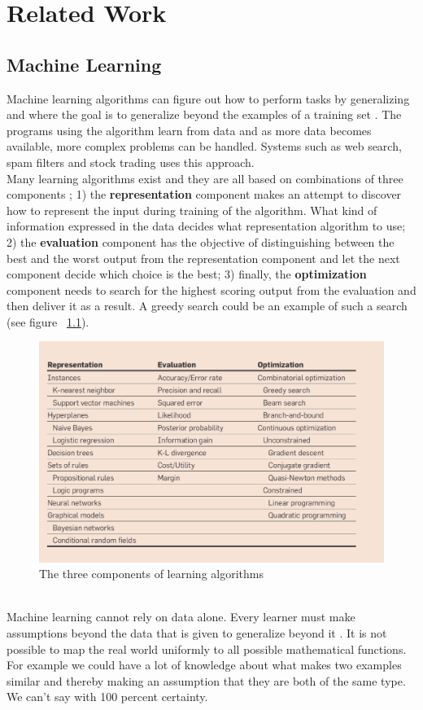 \documentclass[twoside,11pt,openright]{report}
\begin{document}

\chapter{Related Work}
\label{ch:related work}
\section{Machine Learning}
Machine learning algorithms can figure out how to perform tasks by generalizing and where the goal is to generalize beyond the examples of a training set \cite{18}. The programs using the algorithm learn from data and as more data becomes available, more complex problems can be handled. Systems such as web search, spam filters and stock trading uses this approach.
\\[0.5cm]
Many learning algorithms exist and they are all based on combinations of three components \cite{18}; 1) the \textbf{representation} component makes an attempt to discover how to represent the input during training of the algorithm. What kind of information expressed in the data decides what representation algorithm to use; 2) the \textbf{evaluation} component has the objective of distinguishing between the best and the worst output from the representation component and let the next component decide which choice is the best; 3) finally, the \textbf{optimization} component needs to search for the highest scoring output from the evaluation and then deliver it as a result. A greedy search could be an example of such a search (see figure ~\ref{fig:threeComponents}).
\begin{figure}[h!]
\centering
\includegraphics[width=0.6\linewidth,natwidth=898,natheight=587]{billeder/Table1-TheComponentsOfLearningAlgorithms.png}
\caption{The three components of learning algorithms \cite{18}}
\label{fig:threeComponents}
\end{figure}
\\[0.5cm] 
Machine learning cannot rely on data alone. Every learner must make assumptions beyond the data that is given to generalize beyond it \cite{18}. It is not possible to map the real world uniformly to all possible mathematical functions. For example we could have a lot of knowledge about what makes two examples similar and thereby making an assumption that they are both of the same type. We can't say with 100 percent certainty. 
\end{document}
